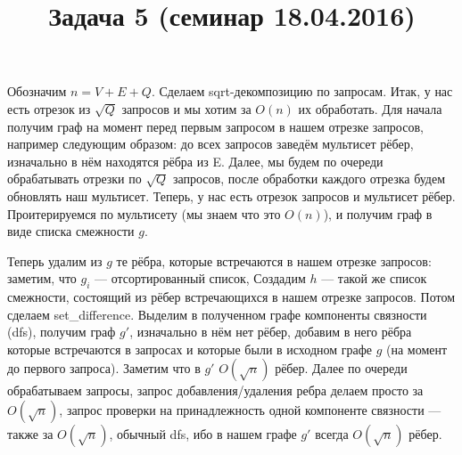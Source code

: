 \documentclass{article}
\title{Задача 5 (семинар 18.04.2016)}
\author{}
\date{}
\begin{document}
\maketitle

Обозначим $n = V+E+Q$. Сделаем sqrt-декомпозицию по запросам. Итак, у нас есть отрезок из $\sqrt{Q}$ запросов и мы хотим за $O(n)$ их обработать. Для начала получим граф на момент перед первым запросом в нашем отрезке запросов, например следующим образом: до всех запросов заведём мультисет рёбер, изначально в нём находятся рёбра из E. Далее, мы будем по очереди обрабатывать отрезки по $\sqrt{Q}$ запросов, после обработки каждого отрезка будем обновлять наш мультисет. Теперь, у нас есть отрезок запросов и мультисет рёбер. Проитерируемся по мультисету (мы знаем что это $O(n)$), и получим граф в виде списка смежности $g$. 

Теперь удалим из $g$ те рёбра, которые встречаются в нашем отрезке запросов: заметим, что $g_i$ --- отсортированный список, Создадим $h$ --- такой же список смежности, состоящий из рёбер встречающихся в нашем отрезке запросов. Потом сделаем set\_difference. Выделим в полученном графе компоненты связности (dfs), получим граф $g'$, изначально в нём нет рёбер, добавим в него рёбра которые встречаются в запросах и которые были в исходном графе $g$ (на момент до первого запроса). Заметим что в $g'$ $O(\sqrt{n})$ рёбер. Далее по очереди обрабатываем запросы, запрос добавления/удаления ребра делаем просто за $O(\sqrt{n})$, запрос проверки на принадлежность одной компоненте связности --- также за $O(\sqrt{n})$, обычный dfs, ибо в нашем графе $g'$ всегда $O(\sqrt{n})$ рёбер.
\end{document}
